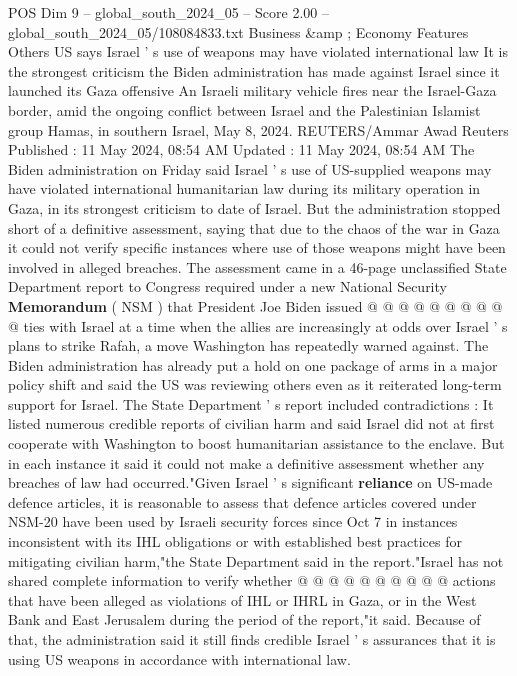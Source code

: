 \begin{textsample}{POS Dim 9 – global\_south\_2024\_05 – Score 2.00 – global\_south\_2024\_05/108084833.txt}  \label{ex:f9_pos_038}
Business \&amp ; Economy Features Others US says Israel ' s use of weapons may have violated international law It is the strongest criticism the Biden administration has made against Israel since it launched its Gaza offensive An Israeli military vehicle fires near the Israel-Gaza border, amid the ongoing conflict between Israel and the Palestinian Islamist group Hamas, in southern Israel, May 8, 2024.
REUTERS/Ammar Awad Reuters Published : 11 May 2024, 08:54 AM Updated : 11 May 2024, 08:54 AM The Biden administration on Friday said Israel ' s use of US-supplied weapons may have violated international humanitarian law during its military operation in Gaza, in its strongest criticism to date of Israel.
But the administration stopped short of a definitive assessment, saying that due to the chaos of the war in Gaza it could not verify specific instances where use of those weapons might have been involved in alleged breaches.
The assessment came in a 46-page unclassified State Department report to Congress required under a new National Security \textbf{Memorandum} ( NSM ) that President Joe Biden issued @ @ @ @ @ @ @ @ @ @ ties with Israel at a time when the allies are increasingly at odds over Israel ' s plans to strike Rafah, a move Washington has repeatedly warned against.
The Biden administration has already put a hold on one package of arms in a major policy shift and said the US was reviewing others even as it reiterated long-term support for Israel.
The State Department ' s report included contradictions : It listed numerous credible reports of civilian harm and said Israel did not at first cooperate with Washington to boost humanitarian assistance to the enclave.
But in each instance it said it could not make a definitive assessment whether any breaches of law had occurred."Given Israel ' s significant \textbf{reliance} on US-made defence articles, it is reasonable to assess that defence articles covered under NSM-20 have been used by Israeli security forces since Oct 7 in instances inconsistent with its IHL obligations or with established best practices for mitigating civilian harm,"the State Department said in the report."Israel has not shared complete information to verify whether @ @ @ @ @ @ @ @ @ @ actions that have been alleged as violations of IHL or IHRL in Gaza, or in the West Bank and East Jerusalem during the period of the report,"it said.
Because of that, the administration said it still finds credible Israel ' s assurances that it is using US weapons in accordance with international law.

\end{textsample}
